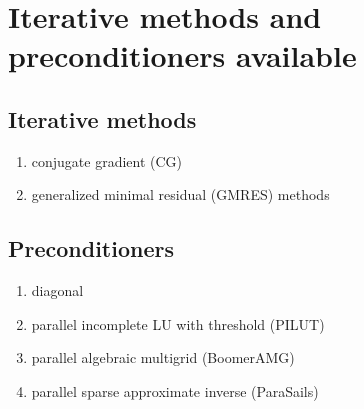 \section{Iterative methods and preconditioners available}

\subsection{Iterative methods}

\begin{enumerate}
\item conjugate gradient (CG)
\item generalized minimal residual (GMRES) methods
\end{enumerate}

\subsection{Preconditioners}

\begin{enumerate}
\item diagonal
\item parallel incomplete LU with threshold (PILUT)
\item parallel algebraic multigrid (BoomerAMG)
\item parallel sparse approximate inverse (ParaSails)
\end{enumerate}


